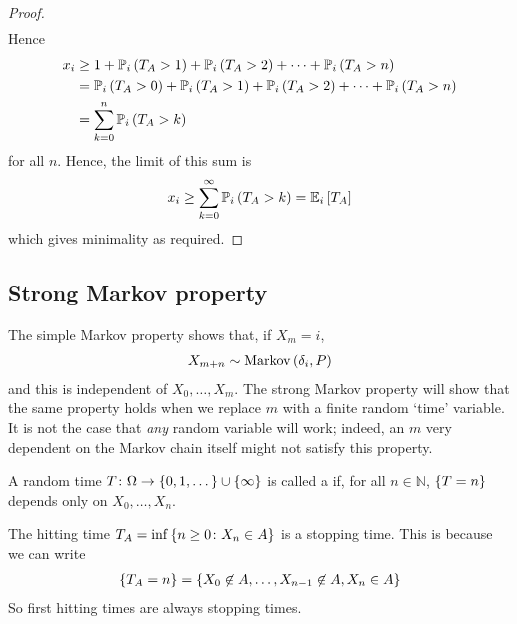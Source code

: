 \begin{proof}
\begin{align*}
	\end{align*}
	Hence
	\begin{align*}
		x_i & \geq 1 + \mathbb{P}_{i}\left({T_A > 1}\right) + \mathbb{P}_{i}\left({T_A > 2}\right) + \dots + \mathbb{P}_{i}\left({T_A > n}\right)              \\
		    & = \mathbb{P}_{i}\left({T_A > 0}\right) + \mathbb{P}_{i}\left({T_A > 1}\right) + \mathbb{P}_{i}\left({T_A > 2}\right) + \dots + \mathbb{P}_{i}\left({T_A > n}\right) \\
		    & = \sum_{k = 0}^n \mathbb{P}_{i}\left({T_A > k}\right)
	\end{align*}
	for all $n$.
	Hence, the limit of this sum is
	\begin{align*}
		x_i \geq \sum_{k=0}^\infty \mathbb{P}_{i}\left({T_A > k}\right) = \mathbb{E}_{i}\left[{T_A}\right]
	\end{align*}
	which gives minimality as required.
\end{proof}

\subsection{Strong Markov property}
The simple Markov property shows that, if $X_m = i$,
\begin{align*}
	X_{m + n} \sim \operatorname{Markov}\left({\delta_i, P}\right)
\end{align*}
and this is independent of $X_0, \dots, X_m$.
The strong Markov property will show that the same property holds when we replace $m$ with a finite random `time' variable.
It is not the case that \textit{any} random variable will work; indeed, an $m$ very dependent on the Markov chain itself might not satisfy this property.
\begin{definition}
	A random time $T \colon \Omega \to \qty{0, 1, \dots} \cup \qty{\infty}$ is called a  if, for all $n \in \mathbb N$, $\qty{ T = n }$ depends only on $X_0, \dots, X_n$.
\end{definition}
\begin{example}
	The hitting time $T_A = \inf \qty{ n \geq 0 \colon X_n \in A}$ is a stopping time.
	This is because we can write
	\begin{align*}
		\qty{T_A = n} = \qty{X_0 \not\in A, \dots, X_{n-1} \not\in A, X_n \in A}
	\end{align*}
	So first hitting times are always stopping times.
\end{example}

